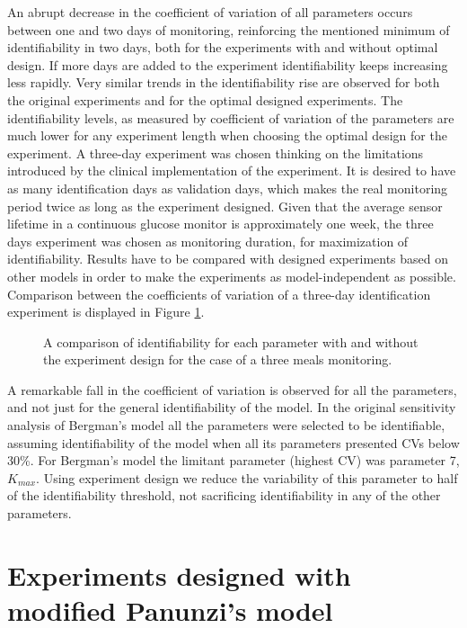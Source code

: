 An abrupt decrease in the coefficient of variation of all parameters occurs between one and two days of monitoring, reinforcing the mentioned minimum of identifiability in two days, both for the experiments with and without optimal design. If more days are added to the experiment identifiability keeps increasing less rapidly. Very similar trends in the identifiability rise are observed for both the original experiments and for the optimal designed experiments. The identifiability levels, as measured by coefficient of variation of the parameters are much lower for any experiment length when choosing the optimal design for the experiment. A three-day experiment was chosen thinking on the limitations introduced by the clinical implementation of the experiment. It is desired to have as many identification days as validation days, which makes the real monitoring period twice as long as the experiment designed. Given that the average sensor lifetime in a continuous glucose monitor is approximately one week, the three days experiment was chosen as monitoring duration, for maximization of identifiability. Results have to be compared with designed experiments based on other models in order to make the experiments as model-independent as possible. Comparison between the coefficients of variation of a three-day identification experiment is displayed in Figure \ref{fig:Bergmanoptdesign3days}.

\begin{figure}[hbt]
\centering
{}\caption{A comparison of identifiability for each parameter with and without the experiment design for the case of a three meals monitoring.}
\label{fig:Bergmanoptdesign3days}
\end{figure}

A remarkable fall in the coefficient of variation is observed for all the parameters, and not just for the general identifiability of the model. In the original sensitivity analysis of Bergman's model all the parameters were selected to be identifiable, assuming identifiability of the model when all its parameters presented CVs below 30\%. For Bergman's model the limitant parameter (highest CV) was parameter 7, $K_{max}$. Using experiment design we reduce the variability of this parameter to half of the identifiability threshold, not sacrificing identifiability in any of the other parameters.

\section{Experiments designed with modified Panunzi's model}
\label{sec:ExperimentsDesignedWithPanunziSModelModified}

